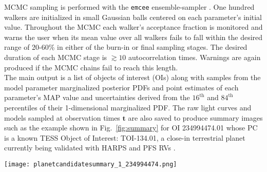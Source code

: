 MCMC sampling is performed with the \texttt{emcee}
ensemble-sampler \citep{foremanmackey13}. One hundred walkers are initialized in small Gaussian balls
centered on each parameter's initial value. Throughout the MCMC each walker's acceptance
fraction is monitored and warns the user when its mean value over all walkers fails to
fall within the desired range of 20-60\% in either of the burn-in or final sampling stages.
The desired duration of each MCMC stage is $\gtrsim 10$ autocorrelation times. Warnings are again produced
if the MCMC chains fail to reach this length. \\

The main \pipeline{} output is a list of objects of interest (OIs)
along with samples from the model parameter marginalized
posterior PDFs and point estimates of each parameter's MAP value and uncertainties derived from the
$16^{\text{th}}$ and $84^{\text{th}}$ percentiles of their 1-dimensional marginalized PDF.
The raw light curves and models
sampled at observation times $\mathbf{t}$ are also saved to produce summary images 
such as the example shown in Fig.~\ref{fig:summary} for OI 234994474.01  
whose PC is a known TESS Object of Interest: TOI-134.01, a close-in terrestrial planet currently being
validated with HARPS and PFS RVs \citep{astudillodefru19}. \\


\begin{figure*}
  \centering
  \texttt{[image: planetcandidatesummary\_1\_234994474.png]}
  \caption{The summary image output from running \pipeline{} on TIC 234994474 and the resulting
    detection of OI 234994474.01 which is consistent with the known TOI-134.01. The \tess{}
    magnitude $T$ and \gaia{-}derived physical stellar parameters 
    are annotated at the top. \emph{Top panel}: the 2 minute extracted light curve from
    the TESS SPOC along with the mean GP systematic model
    (orange line) and the
    times of TOI-134.01 planetary transits indicated by the vertical ticks. \emph{Second panel}: the
    de-trended light curve. \emph{Third panel}: the linear search S/N spectra calculated
    from the likelihood of the data given a box model with fixed mid-transit time $T_0$ and for
    each of the three fixed transit durations $D$ (i.e. 1.2, 2.4, and 4.8 hours).
    Each spectrum is offset for clarity along with the $5\sigma$ S/N threshold.
    \emph{Fourth panel}: the complete and binned ($\Delta t = 0.2D/P$) de-trended light curve
    phase-folded to the MAP orbital period $P$ and mid-transit time $T_0$ of the planet candidate.
    \emph{Bottom panel}: zoom-in on the transit in the de-trended and phase-folded light curve.
    Various diagnostic quantities are reported in the lower right corner along with measured
    and derived transit parameters.}
  \label{fig:summary}
\end{figure*}


